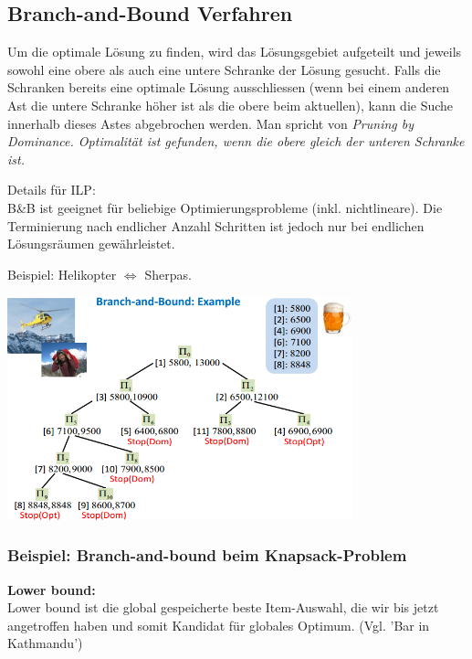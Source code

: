 \subsection{Branch-and-Bound Verfahren }
	\begin{minipage}{8cm}
		Um die optimale Lösung zu finden, wird das Lösungsgebiet aufgeteilt und jeweils sowohl eine obere als auch eine untere Schranke der Lösung gesucht. Falls die Schranken bereits eine optimale Lösung ausschliessen (wenn bei einem anderen Ast die untere Schranke höher ist als die obere beim aktuellen), kann die Suche innerhalb dieses Astes abgebrochen werden. Man spricht von \em Pruning by Dominance\em. Optimalität ist gefunden, wenn die obere gleich der unteren Schranke ist.
		
		Details für ILP: \\
		B\&B ist geeignet für beliebige Optimierungsprobleme (inkl. nichtlineare). Die Terminierung nach endlicher Anzahl Schritten ist jedoch nur bei endlichen Lösungsräumen gewährleistet.
	\end{minipage}
	\begin{minipage}{10cm}
		Beispiel: Helikopter $\Leftrightarrow$ Sherpas.
		
		\includegraphics[width=10cm]{Content/IntProg/branch-bound}
	\end{minipage}
\subsubsection{Beispiel: Branch-and-bound beim Knapsack-Problem }

\textbf{Lower bound:}\\
Lower bound ist die global gespeicherte beste Item-Auswahl, die wir bis jetzt angetroffen haben und somit Kandidat für globales Optimum. (Vgl. 'Bar in Kathmandu')\\

